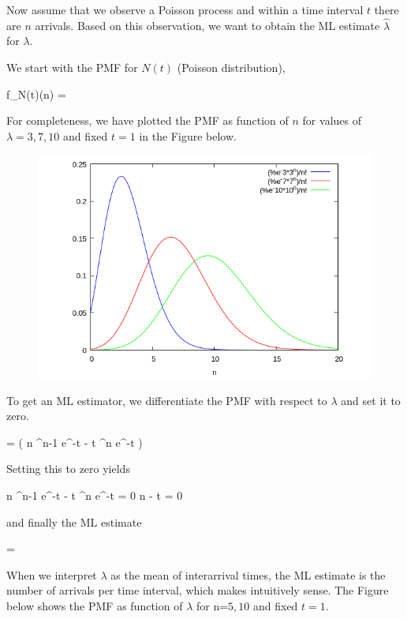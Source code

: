 
Now assume that we observe a Poisson process and within a time interval $t$ there are $n$ arrivals. Based on this observation, we want to obtain the ML estimate $\hat\lambda$ for $\lambda$.

We start with the PMF for $N(t)$ (Poisson distribution),

\bee
f_{N(t)}(n) = 
\eee

For completeness, we have plotted the PMF as function of $n$ for values of $\lambda = 3, 7, 10$ and fixed $t=1$ in the Figure below.

\begin{figure}[H]
  \includegraphics[scale=0.6]{images/poisson_process_2_1.png}
\end{figure}


To get an ML estimator, we differentiate the PMF with respect to $\lambda$ and set it to zero.

\bee
{} =  \left( n \lambda^{n-1} e^{-\lambda t} - t \lambda^n e^{-\lambda t} \right)
\eee

Setting this to zero yields

\bee
n \lambda^{n-1} e^{-\lambda t} - t \lambda^n e^{-\lambda t} = 0 \rightarrow n - t \lambda = 0
\eee

and finally the ML estimate

\bee
\hat \lambda = 
\eee

When we interpret $\lambda$ as the mean of interarrival times, the ML estimate is the number of arrivals per time interval, which makes intuitively sense. The Figure below shows the PMF as function of $\lambda$ for n=$5,10$ and fixed $t=1$.



